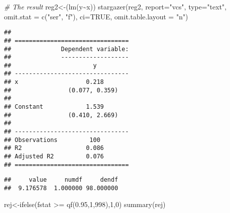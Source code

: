 \documentclass[
]{article}
\newenvironment{Shaded}{\begin{snugshade}}{\end{snugshade}}
\newcommand{\AttributeTok}[1]{\textcolor[rgb]{0.77,0.63,0.00}{#1}}
\newcommand{\CommentTok}[1]{\textcolor[rgb]{0.56,0.35,0.01}{\textit{#1}}}
\newcommand{\ConstantTok}[1]{\textcolor[rgb]{0.00,0.00,0.00}{#1}}
\newcommand{\DecValTok}[1]{\textcolor[rgb]{0.00,0.00,0.81}{#1}}
\newcommand{\FloatTok}[1]{\textcolor[rgb]{0.00,0.00,0.81}{#1}}
\newcommand{\FunctionTok}[1]{\textcolor[rgb]{0.00,0.00,0.00}{#1}}
\newcommand{\NormalTok}[1]{#1}
\newcommand{\OtherTok}[1]{\textcolor[rgb]{0.56,0.35,0.01}{#1}}
\newcommand{\SpecialCharTok}[1]{\textcolor[rgb]{0.00,0.00,0.00}{#1}}
\newcommand{\StringTok}[1]{\textcolor[rgb]{0.31,0.60,0.02}{#1}}
\begin{document}
\begin{Shaded}
\begin{Highlighting}[]
\CommentTok{\# The result}
\NormalTok{reg2}\OtherTok{\textless{}{-}}\NormalTok{(}\FunctionTok{lm}\NormalTok{(y}\SpecialCharTok{\textasciitilde{}}\NormalTok{x))}
\FunctionTok{stargazer}\NormalTok{(reg2, }\AttributeTok{report=}\StringTok{"vcs"}\NormalTok{, }\AttributeTok{type=}\StringTok{"text"}\NormalTok{,}
          \AttributeTok{omit.stat =} \FunctionTok{c}\NormalTok{(}\StringTok{"ser"}\NormalTok{, }\StringTok{"f"}\NormalTok{),}
          \AttributeTok{ci=}\ConstantTok{TRUE}\NormalTok{, }\AttributeTok{omit.table.layout =} \StringTok{"n"}\NormalTok{)}
\end{Highlighting}
\end{Shaded}

\begin{verbatim}
## 
## ================================
##              Dependent variable:
##              -------------------
##                       y         
## --------------------------------
## x                   0.218       
##                (0.077, 0.359)   
##                                 
## Constant            1.539       
##                (0.410, 2.669)   
##                                 
## --------------------------------
## Observations         100        
## R2                  0.086       
## Adjusted R2         0.076       
## ================================
\end{verbatim}

\begin{Shaded}
\end{Shaded}

\begin{verbatim}
##     value     numdf     dendf 
##  9.176578  1.000000 98.000000
\end{verbatim}

\begin{Shaded}
\begin{Highlighting}[]
\NormalTok{rej}\OtherTok{\textless{}{-}}\FunctionTok{ifelse}\NormalTok{(fstat }\SpecialCharTok{\textgreater{}=} \FunctionTok{qf}\NormalTok{(}\FloatTok{0.95}\NormalTok{,}\DecValTok{1}\NormalTok{,}\DecValTok{998}\NormalTok{),}\DecValTok{1}\NormalTok{,}\DecValTok{0}\NormalTok{)}
\FunctionTok{summary}\NormalTok{(rej)}
\end{Highlighting}
\end{Shaded}
\end{document}
